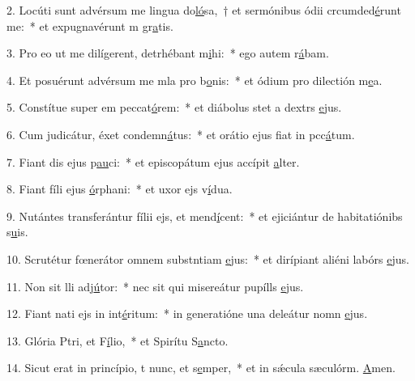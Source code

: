 2. Locúti sunt advérsum me lingua do\uline{ló}sa,~† et sermónibus ódii crcumded\uline{é}runt me:~* et expugnavérunt m gr\uline{a}tis.\par 
3. Pro eo ut me dilígerent, detrhébant m\uline{i}hi:~* ego autem r\uline{á}bam.\par 
4. Et posuérunt advérsum me mla pro b\uline{o}nis:~* et ódium pro dilectión m\uline{e}a.\par 
5. Constítue super em peccat\uline{ó}rem:~* et diábolus stet a dextrs \uline{e}jus.\par 
6. Cum judicátur, éxet condemn\uline{á}tus:~* et orátio ejus fiat in pcc\uline{á}tum.\par 
7. Fiant dis ejus p\uline{au}ci:~* et episcopátum ejus accípit \uline{a}lter.\par 
8. Fiant fíli ejus \uline{ó}rphani:~* et uxor ejs v\uline{í}dua.\par 
9. Nutántes transferántur fílii ejs, et mend\uline{í}cent:~* et ejiciántur de habitatiónibs s\uline{u}is.\par 
10. Scrutétur fœnerátor omnem substntiam \uline{e}jus:~* et dirípiant aliéni labórs \uline{e}jus.\par 
11. Non sit lli adj\uline{ú}tor:~* nec sit qui misereátur pupílls \uline{e}jus.\par 
12. Fiant nati ejs in int\uline{é}ritum:~* in generatióne una deleátur nomn \uline{e}jus.\par 
13. Glória Ptri, et F\uline{í}lio,~* et Spirítu S\uline{a}ncto.\par 
14. Sicut erat in princípio, t nunc, et s\uline{e}mper,~* et in sǽcula sæculórm. \uline{A}men.\par 
